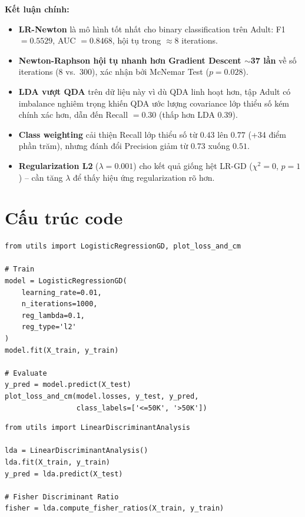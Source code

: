\documentclass[12pt, a4paper]{article}
\begin{document}
\textbf{Kết luận chính:}
\begin{itemize}
  \item \textbf{LR-Newton} là mô hình tốt nhất cho binary classification trên Adult:
        F1 $= 0.5529$, AUC $= 0.8468$, hội tụ trong $\approx 8$ iterations.
  \item \textbf{Newton-Raphson hội tụ nhanh hơn Gradient Descent $\sim$37 lần}
        về số iterations (8 vs.\ 300), xác nhận bởi McNemar Test ($p = 0.028$).
  \item \textbf{LDA vượt QDA} trên dữ liệu này vì dù QDA linh hoạt hơn, tập Adult có
        imbalance nghiêm trọng khiến QDA ước lượng covariance lớp thiểu số kém chính xác hơn,
        dẫn đến Recall $= 0.30$ (thấp hơn LDA $0.39$).
  \item \textbf{Class weighting} cải thiện Recall lớp thiểu số từ $0.43$ lên $0.77$
        (+34 điểm phần trăm), nhưng đánh đổi Precision giảm từ $0.73$ xuống $0.51$.
  \item \textbf{Regularization L2} ($\lambda = 0.001$) cho kết quả giống hệt LR-GD
        ($\chi^2 = 0$, $p = 1$) -- cần tăng $\lambda$ để thấy hiệu ứng regularization rõ hơn.
\end{itemize}

\appendix

\section{Cấu trúc code}
\label{app:code}

\begin{lstlisting}[caption={Ví dụ sử dụng LogisticRegressionGD}]
from utils import LogisticRegressionGD, plot_loss_and_cm

# Train
model = LogisticRegressionGD(
    learning_rate=0.01,
    n_iterations=1000,
    reg_lambda=0.1,
    reg_type='l2'
)
model.fit(X_train, y_train)

# Evaluate
y_pred = model.predict(X_test)
plot_loss_and_cm(model.losses, y_test, y_pred,
                 class_labels=['<=50K', '>50K'])
\end{lstlisting}

\begin{lstlisting}[caption={Ví dụ sử dụng LDA}]
from utils import LinearDiscriminantAnalysis

lda = LinearDiscriminantAnalysis()
lda.fit(X_train, y_train)
y_pred = lda.predict(X_test)

# Fisher Discriminant Ratio
fisher = lda.compute_fisher_ratios(X_train, y_train)
\end{lstlisting}
\end{document}
